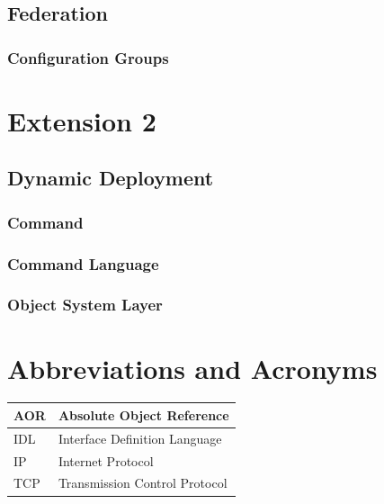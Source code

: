 \documentclass[a4paper]{article}
\begin{document}
\subsection{Federation}
\subsubsection{Configuration Groups}

\section{Extension 2}
\subsection{Dynamic Deployment}
\subsubsection{Command}
\subsubsection{Command Language}
\subsubsection{Object System Layer}

\section{Abbreviations and Acronyms}

	\begin{tabular}{|l|l|}
	\hline
	AOR & Absolute Object Reference\\
	\hline
	IDL & Interface Definition Language\\
	\hline
	IP & Internet Protocol\\
	\hline
	TCP & Transmission Control Protocol\\
	\hline
	\end{tabular}

\newpage


\end{document}
